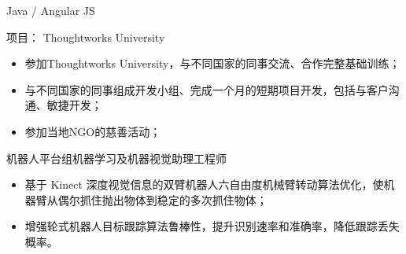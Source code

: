 \documentclass{resume}
\begin{document}
Java / Angular JS

项目： Thoughtworks University
\begin{itemize}
  \item 参加Thoughtworks University，与不同国家的同事交流、合作完整基础训练；
  \item 与不同国家的同事组成开发小组、完成一个月的短期项目开发，包括与客户沟通、敏捷开发；
  \item 参加当地NGO的慈善活动；
\end{itemize}

机器人平台组机器学习及机器视觉助理工程师
\begin{itemize}
  \item 基于 Kinect 深度视觉信息的双臂机器人六自由度机械臂转动算法优化，使机器臂从偶尔抓住抛出物体到稳定的多次抓住物体；
  \item 增强轮式机器人目标跟踪算法鲁棒性，提升识别速率和准确率，降低跟踪丢失概率。
\end{itemize}




\end{document}
